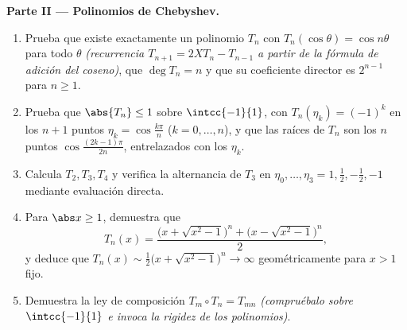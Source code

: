 \begin{problem}
\medskip
\noindent\textbf{Parte II --- Polinomios de Chebyshev.}
\begin{enumerate}[resume]
  \item Prueba que existe exactamente un polinomio $T_n$ con
        $T_n(\cos\theta) = \cos n\theta$ para todo $\theta$
        \emph{(recurrencia $T_{n+1} = 2XT_n - T_{n-1}$ a partir de
        la fórmula de adición del coseno)}, que $\deg T_n = n$ y que
        su coeficiente director es $2^{n-1}$ para $n \geq 1$.
  \item Prueba que $\abs{T_n} \leq 1$ sobre $\intcc{-1}{1}$, con
        $T_n(\eta_k) = (-1)^k$ en los $n + 1$ puntos $\eta_k =
        \cos\frac{k\pi}{n}$ ($k = 0, \dots, n$), y que las raíces de
        $T_n$ son los $n$ puntos $\cos\frac{(2k-1)\pi}{2n}$,
        entrelazados con los $\eta_k$.
  \item Calcula $T_2, T_3, T_4$ y verifica la alternancia de $T_3$
        en $\eta_0, \dots, \eta_3 = 1, \frac12, -\frac12, -1$
        mediante evaluación directa.
  \item Para $\abs x \geq 1$, demuestra que
        \[
        T_n(x) = \frac{\bigl(x + \sqrt{x^2 - 1}\bigr)^n +
        \bigl(x - \sqrt{x^2 - 1}\bigr)^n}{2},
        \]
        y deduce que $T_n(x) \sim \frac12\bigl(x + \sqrt{x^2 -
        1}\bigr)^n \to \infty$ geométricamente para $x > 1$ fijo.
  \item Demuestra la ley de composición $T_m \circ T_n = T_{mn}$
        \emph{(compruébalo sobre $\intcc{-1}{1}$ e invoca la rigidez
        de los polinomios)}.
\end{enumerate}


\end{problem}
